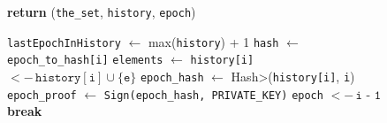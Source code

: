 \begin{figure}[t!]
\begin{adjustbox}{minipage=[t]{\columnwidth}}
\begin{algorithm}[H]
\begin{algorithmic}[1]
            \label{alg:hash_query}
            		\State {}
            		\State \textbf{return} (\texttt{the\_set}, \texttt{history}, \texttt{epoch})
            \EndFunction

			\label{alg:hash_update_history}
				\State \texttt{lastEpochInHistory} $\leftarrow$ max(\texttt{history}) + 1
					\State \texttt{hash} $\leftarrow$  \texttt{epoch\_to\_hash[i]}\label{alg:hash-epoch-to-hash-use}
						\State \texttt{elements} $\leftarrow$ 
							 \label{line:abci-hashchain-history-if}
								\State  \texttt{history[i]} \(<- \, \texttt{history}[\texttt{i}] \cup \{\texttt{e}\}\) \label{line:abci-hashchain-history}
							\EndIf
						\EndFor
						\State \texttt{epoch\_hash} $\leftarrow$ \<Hash>(\texttt{history[i]}, \texttt{i})
						\State \texttt{epoch\_proof} $\leftarrow$  \texttt{Sign(\texttt{epoch\_hash}, PRIVATE\_KEY)}
					\State {}
					\Else
					\State \texttt{epoch} \(<- \, \texttt{i - 1}\)
						\State \textbf{break}
					\EndIf
				\EndFor
			\EndFunction

        \end{algorithmic}
      \end{algorithm}
	\end{adjustbox}
  \end{figure}
  
